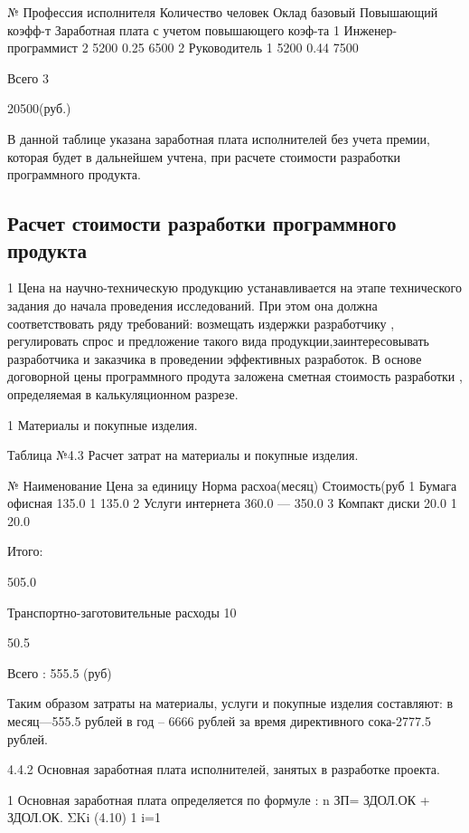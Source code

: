 \begin{ESKDexplanation}
\begin{ESKDexplanation}
\begin{ESKDexplanation}
\begin{ESKDexplanation}
№
Профессия исполнителя
Количество человек
Оклад базовый
Повышающий  коэфф-т
Заработная плата с учетом повышающего коэф-та
1
Инженер-программист
2
5200
0.25
6500
2
Руководитель
1
5200
0.44
7500

Всего
3


20500(руб.)

В данной таблице указана заработная плата исполнителей без учета премии,
которая будет в дальнейшем учтена, при расчете стоимости разработки
программного продукта.

\subsection{Расчет  стоимости  разработки программного продукта}
	1	Цена на научно-техническую продукцию устанавливается на этапе   
технического задания до начала проведения исследований. При  этом она должна соответствовать ряду требований: возмещать  издержки разработчику
, регулировать спрос и предложение такого вида продукции,заинтересовывать
разработчика и заказчика в проведении эффективных разработок. В основе
договорной цены программного продута заложена  сметная  стоимость 
разработки , определяемая в калькуляционном разрезе.

	1	Материалы и покупные изделия.

                                                                                                             Таблица №4.3
                          Расчет затрат на материалы и покупные изделия.

№
Наименование
Цена за единицу
Норма расхоа(месяц)
Стоимость(руб
1
Бумага офисная
135.0
1
135.0
2
Услуги интернета
360.0
---
350.0
3
Компакт диски
20.0
1
20.0

Итого:


505.0

Транспортно-заготовительные расходы 10%


50.5

        Всего :                                                                                            555.5 (руб)

Таким образом затраты на материалы, услуги и покупные изделия составляют:
в месяц—555.5 рублей
в год      – 6666 рублей
за время директивного сока-2777.5 рублей.

4.4.2 Основная заработная плата исполнителей, занятых в разработке
         проекта.

	1	 Основная заработная плата определяется по формуле :
                                                                                   n
                                        ЗП= ЗДОЛ.ОК  +  ЗДОЛ.ОК.   ΣKi                                      (4.10)
	1	                                                                                   i=1


\end{ESKDexplanation}
\end{ESKDexplanation}
\end{ESKDexplanation}
\end{ESKDexplanation}
